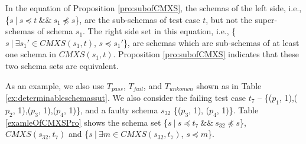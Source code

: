 In the equation of Proposition \ref{pro:subofCMXS}, the schemas of the left side, i.e., \{$s\ |\ s \preceq t\ \&\&\ s_{1} \npreceq s$\}, are the sub-schemas of test case $t$, but not the super-schemas of  schema $s_{1}$.  The right side set in this equation, i.e., \{$ s\ |\ \exists s_{1}' \in CMXS(s_{1}, t)$, $s \preceq s_{1}'$\}, are schemas which are sub-schemas of at least one schema in $CMXS(s_{1}, t)$. Proposition \ref{pro:subofCMXS} indicates that these two schema sets are equivalent.

As an example, we also use $T_{pass}$, $T_{fail}$, and $T_{unkonwn}$ shown as in Table \ref{ex:determinableschemassut}.  We also consider the failing test case $t_{7}$ -- \{($p_{1}$, 1),($p_{2}$, 1),($p_{3}$, 1),($p_{4}$, 1)\}, and a faulty schema $s_{32}$  \{($p_{3}$, 1), ($p_{4}$, 1)\}.
Table \ref{examleOfCMXSPro} shows the schema set  \{$s\ |\ s \preceq t_{7}\ \&\&\ s_{32} \npreceq s$\}, $CMXS(s_{32}, t_{7})$ and \{$ s\ |\ \exists m \in CMXS(s_{32}, t_{7})$, $s \preceq m$\}.


